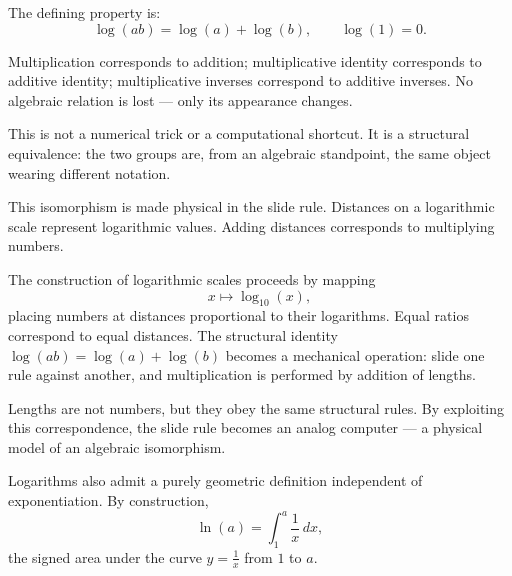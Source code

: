 \medskip

The defining property is:
\[
\log(ab)=\log(a)+\log(b),
\qquad
\log(1)=0.
\]

Multiplication corresponds to addition; multiplicative identity corresponds to
additive identity; multiplicative inverses correspond to additive inverses.
No algebraic relation is lost --- only its appearance changes.

\medskip

This is not a numerical trick or a computational shortcut.
It is a structural equivalence: the two groups are, from an algebraic standpoint,
the same object wearing different notation.


\medskip

This isomorphism is made physical in the slide rule.
Distances on a logarithmic scale represent logarithmic values.
Adding distances corresponds to multiplying numbers.

\medskip

The construction of logarithmic scales proceeds by mapping
\[
x \mapsto \log_{10}(x),
\]
placing numbers at distances proportional to their logarithms.
Equal ratios correspond to equal distances.
The structural identity $\log(ab)=\log(a)+\log(b)$ becomes a mechanical operation:
slide one rule against another, and multiplication is performed by addition of lengths.

\medskip

Lengths are not numbers, but they obey the same structural rules.
By exploiting this correspondence, the slide rule becomes an analog computer ---
a physical model of an algebraic isomorphism.


\medskip

Logarithms also admit a purely geometric definition independent of exponentiation.
By construction,
\[
\ln(a)=\int_1^a \frac{1}{x}\,dx,
\]
the signed area under the curve $y=\frac{1}{x}$ from $1$ to $a$.

